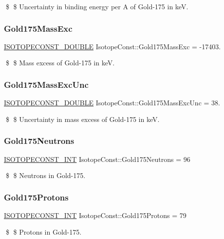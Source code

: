 \$ \$ Uncertainty in binding energy per A of Gold-\/175 in keV. \mbox{\label{group___isotope_const-_gold-_au175_ga2a81675cfb0d7d866c401f39b3c6aa59}} 
\subsubsection{\texorpdfstring{Gold175\+Mass\+Exc}{Gold175MassExc}}
{\footnotesize\ttfamily \mbox{\hyperlink{group___isotope_const-_macros_ga8f45a7272ce02c0b4c65c44636ed719a}{I\+S\+O\+T\+O\+P\+E\+C\+O\+N\+S\+T\+\_\+\+D\+O\+U\+B\+LE}} Isotope\+Const\+::\+Gold175\+Mass\+Exc = -\/17403.}

\$ \$ Mass excess of Gold-\/175 in keV. \mbox{\label{group___isotope_const-_gold-_au175_ga58799249320d27de2084843e5965791a}} 
\subsubsection{\texorpdfstring{Gold175\+Mass\+Exc\+Unc}{Gold175MassExcUnc}}
{\footnotesize\ttfamily \mbox{\hyperlink{group___isotope_const-_macros_ga8f45a7272ce02c0b4c65c44636ed719a}{I\+S\+O\+T\+O\+P\+E\+C\+O\+N\+S\+T\+\_\+\+D\+O\+U\+B\+LE}} Isotope\+Const\+::\+Gold175\+Mass\+Exc\+Unc = 38.}

\$ \$ Uncertainty in mass excess of Gold-\/175 in keV. \mbox{\label{group___isotope_const-_gold-_au175_ga5c117d3ca82542610ba728a991d38889}} 
\subsubsection{\texorpdfstring{Gold175\+Neutrons}{Gold175Neutrons}}
{\footnotesize\ttfamily \mbox{\hyperlink{group___isotope_const-_macros_ga5f18360b3e99483a35c32d789e62621c}{I\+S\+O\+T\+O\+P\+E\+C\+O\+N\+S\+T\+\_\+\+I\+NT}} Isotope\+Const\+::\+Gold175\+Neutrons = 96}

\$ \$ Neutrons in Gold-\/175. \mbox{\label{group___isotope_const-_gold-_au175_gae7f8798c397427e188d7937454e52714}} 
\subsubsection{\texorpdfstring{Gold175\+Protons}{Gold175Protons}}
{\footnotesize\ttfamily \mbox{\hyperlink{group___isotope_const-_macros_ga5f18360b3e99483a35c32d789e62621c}{I\+S\+O\+T\+O\+P\+E\+C\+O\+N\+S\+T\+\_\+\+I\+NT}} Isotope\+Const\+::\+Gold175\+Protons = 79}

\$ \$ Protons in Gold-\/175. 